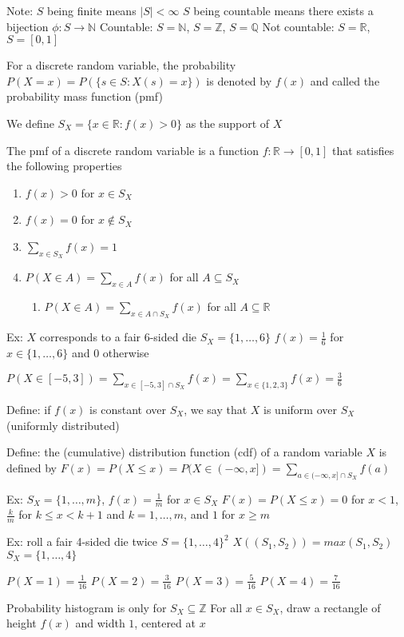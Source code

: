 \documentclass{article}
\begin{document}
Note:
$S$ being finite means $\lvert S\rvert<\infty$
$S$ being countable means there exists a bijection $\phi:S\to\mathbb{N}$
Countable: $S=\mathbb{N}$, $S=\mathbb{Z}$, $S=\mathbb{Q}$
Not countable: $S=\mathbb{R}$, $S=[0,1]$

For a discrete random variable, the probability $P(X=x)=P(\{s\in S:X(s)=x\})$ is denoted by $f(x)$ and called the probability mass function (pmf)

We define $S_X=\{x\in\mathbb{R}:f(x)>0\}$ as the support of $X$

The pmf of a discrete random variable is a function $f:\mathbb{R}\to[0,1]$ that satisfies the following properties
\begin{enumerate}
    \item $f(x)>0$ for $x\in S_X$
    \item $f(x)=0$ for $x\notin S_X$
    \item $\sum_{x\in S_X}f(x)=1$
    \item $P(X\in A)=\sum_{x\in A}f(x)$ for all $A\subseteq S_X$
    \begin{enumerate}
        \item $P(X\in A)=\sum_{x\in A\cap S_X}f(x)$ for all $A\subseteq\mathbb{R}$
    \end{enumerate}
\end{enumerate}

Ex: $X$ corresponds to a fair 6-sided die
$S_X=\{1,\dots,6\}$
$f(x)=\frac{1}{6}$ for $x\in\{1,\dots,6\}$ and $0$ otherwise

$P(X\in[-5,3])=\sum_{x\in[-5,3]\cap S_X}f(x)=\sum_{x\in\{1,2,3\}}f(x)=\frac{3}{6}$

Define: if $f(x)$ is constant over $S_X$, we say that $X$ is uniform over $S_X$ (uniformly distributed)

Define: the (cumulative) distribution function (cdf) of a random variable $X$ is defined by $F(x)=P(X\le x)=P(X\in(-\infty,x])=\sum_{a\in(-\infty,x]\cap S_X}f(a)$

Ex: $S_X=\{1,\dots,m\}$, $f(x)=\frac{1}{m}$ for $x\in S_X$
$F(x)=P(X\le x)=0$ for $x<1$, $\frac{k}{m}$ for $k\le x<k+1$ and $k=1,\dots,m$, and $1$ for $x\ge m$

Ex: roll a fair 4-sided die twice
$S=\{1,\dots,4\}^2$
$X((S_1,S_2))=max(S_1,S_2)$
$S_X=\{1,\dots,4\}$

$P(X=1)=\frac{1}{16}$
$P(X=2)=\frac{3}{16}$
$P(X=3)=\frac{5}{16}$
$P(X=4)=\frac{7}{16}$

Probability histogram is only for $S_X\subseteq\mathbb{Z}$
For all $x\in S_X$, draw a rectangle of height $f(x)$ and width $1$, centered at $x$
\end{document}
